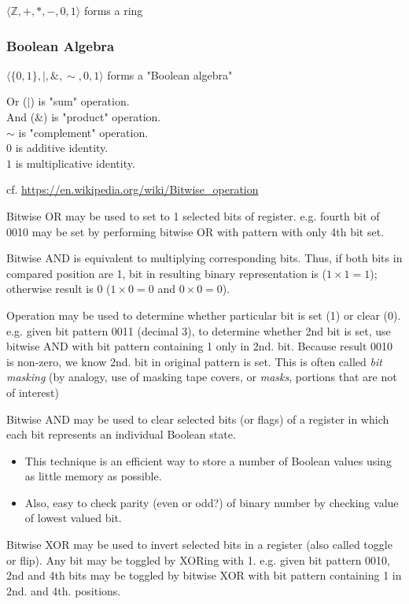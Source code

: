 \documentclass[10pt]{amsart}
\begin{document}
$\langle \mathbb{Z}, +, *, - , 0 , 1 \rangle$ forms a ring

\subsubsection{Boolean Algebra}

$\langle \lbrace 0, 1 \rbrace , |, \& , \sim, 0, 1 \rangle $ forms a "Boolean algebra"

Or ($|$) is "sum" operation. \\
And ($\&$) is "product" operation. \\
$\sim$ is "complement" operation. \\
$0$ is additive identity. \\
$1$ is multiplicative identity.

cf. \url{https://en.wikipedia.org/wiki/Bitwise_operation}

Bitwise OR may be used to set to 1 selected bits of register. e.g. fourth bit of 0010 may be set by performing bitwise OR with pattern with only 4th bit set.

Bitwise AND is equivalent to multiplying corresponding bits. Thus, if both bits in compared position are 1, bit in resulting binary representation is ($1 \times 1 = 1$); otherwise result is 0 ($1 \times 0 = 0$ and $0 \times 0 = 0$).

Operation may be used to determine whether particular bit is set (1) or clear (0). e.g. given bit pattern 0011 (decimal 3), to determine whether 2nd bit is set, use bitwise AND with bit pattern containing 1 only in 2nd. bit. Because result 0010 is non-zero, we know 2nd. bit in original pattern is set. This is often called \emph{bit masking} (by analogy, use of masking tape covers, or \emph{masks}, portions that are not of interest)

Bitwise AND may be used to clear selected bits (or flags) of a register in which each bit represents an individual Boolean state.
\begin{itemize}
	\item This technique is an efficient way to store a number of Boolean values using as little memory as possible.
	\item Also, easy to check parity (even or odd?) of binary number by checking value of lowest valued bit.
\end{itemize}

Bitwise XOR may be used to invert selected bits in a register (also called toggle or flip). Any bit may be toggled by XORing with 1. e.g. given bit pattern 0010, 2nd and 4th bits may be toggled by bitwise XOR with bit pattern containing 1 in 2nd. and 4th. positions.
\end{document}
